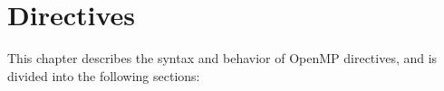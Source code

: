 %
%
%
%
%
%
%
%
%
%
%
%
%
\chapter{Directives}
\label{chap:Directives}
This chapter describes the syntax and behavior of OpenMP directives, and is divided 
into the following sections:

